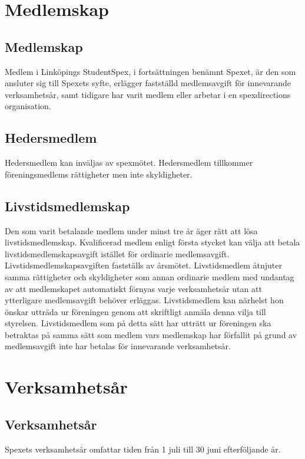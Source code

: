 \documentclass[a4paper]{article}
\begin{document}
\section{Medlemskap}
\subsection{Medlemskap}
Medlem i Linköpings StudentSpex, i fortsättningen benämnt Spexet, är den som ansluter sig till Spexets syfte, erlägger fastställd medlemsavgift för innevarande verksamhetsår, samt tidigare har varit medlem eller arbetar i en spexdirections organisation.

\subsection{Hedersmedlem}
Hedersmedlem kan inväljas av spexmötet. Hedersmedlem tillkommer föreningsmedlems rättigheter men inte skyldigheter.

\subsection{Livstidsmedlemskap}
Den som varit betalande medlem under minst tre år äger rätt att lösa livstidsmedlemskap. Kvalificerad medlem enligt första stycket kan välja att betala livstidsmedlemskapsavgift istället för ordinarie medlemsavgift. \newline
\newline
Livstidsmedlemskapsavgiften fastställs av årsmötet.\newline
\newline
Livstidsmedlem åtnjuter samma rättigheter och skyldigheter som annan ordinarie medlem med undantag av att medlemskapet automatiskt förnyas varje verksamhetsår utan att ytterligare medlemsavgift behöver erläggas.\newline
\newline
Livstidsmedlem kan närhelst hon önskar utträda ur föreningen genom att skriftligt anmäla denna vilja till styrelsen. Livstidsmedlem som på detta sätt har utträtt ur föreningen ska betraktas på samma sätt som medlem vars medlemskap har förfallit på grund av medlemsavgift inte har betalas för innevarande verksamhetsår.

\section{Verksamhetsår}
\subsection{Verksamhetsår}
Spexets verksamhetsår omfattar tiden från 1 juli till 30 juni efterföljande år.
\end{document}
